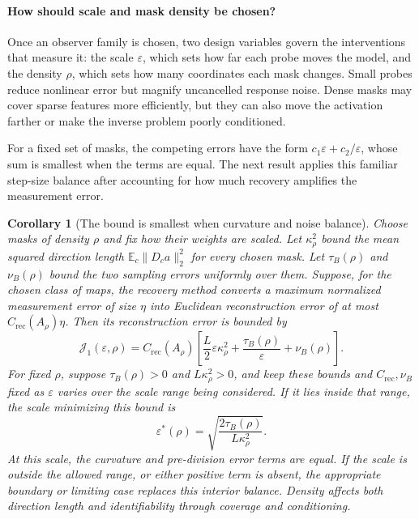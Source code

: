\documentclass[sigconf,10pt,nonacm,balance=false]{acmart}
\newcommand{\eps}{\varepsilon}
\newcommand{\E}{\mathbb{E}}
\newtheorem{corollary}{Corollary}
\begin{document}
\paragraph{How should scale and mask density be chosen?}
Once an observer family is chosen, two design variables govern the interventions that measure it: the scale $\eps$, which sets how far each probe moves the model, and the density $\rho$, which sets how many coordinates each mask changes. Small probes reduce nonlinear error but magnify uncancelled response noise. Dense masks may cover sparse features more efficiently, but they can also move the activation farther or make the inverse problem poorly conditioned.

For a fixed set of masks, the competing errors have the form $c_1\eps+c_2/\eps$, whose sum is smallest when the terms are equal. The next result applies this familiar step-size balance after accounting for how much recovery amplifies the measurement error.

\begin{corollary}[The bound is smallest when curvature and noise balance]\label{cor:scale-density}
Choose masks of density $\rho$ and fix how their weights are scaled. Let $\kappa_\rho^2$ bound the mean squared direction length $\E_c\|D_ca\|_2^2$ for every chosen mask. Let $\tau_B(\rho)$ and $\nu_B(\rho)$ bound the two sampling errors uniformly over them. Suppose, for the chosen class of maps, the recovery method converts a maximum normalized measurement error of size $\eta$ into Euclidean reconstruction error of at most $C_{\mathrm{rec}}(A_\rho)\eta$. Then its reconstruction error is bounded by
\begin{equation}
    \mathcal J_1(\eps,\rho)
    = C_{\mathrm{rec}}(A_\rho)
    \left[
    \frac{L}{2}\eps\kappa_\rho^2
    +\frac{\tau_B(\rho)}{\eps}+\nu_B(\rho)
    \right].
\end{equation}
For fixed $\rho$, suppose $\tau_B(\rho)>0$ and $L\kappa_\rho^2>0$, and keep these bounds and $C_{\mathrm{rec}},\nu_B$ fixed as $\eps$ varies over the scale range being considered. If it lies inside that range, the scale minimizing this bound is
\begin{equation}
    \eps^*(\rho)=\sqrt{\frac{2\tau_B(\rho)}{L\kappa_\rho^2}}.
\end{equation}
At this scale, the curvature and pre-division error terms are equal. If the scale is outside the allowed range, or either positive term is absent, the appropriate boundary or limiting case replaces this interior balance. Density affects both direction length and identifiability through coverage and conditioning.
\end{corollary}
\end{document}
